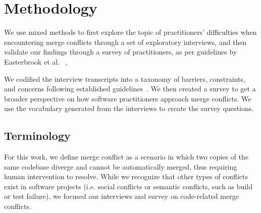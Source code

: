 \section{Methodology}\label{methodology}

We use mixed methods to first explore the topic of practitioners' difficulties when encountering merge conflicts through a set of exploratory interviews, and then validate our findings through a survey of practitioners, as per guidelines by Easterbrook et al. ~\cite{easterbrook2008selecting}, 

We codified the interview transcripts into a taxonomy of barriers, constraints, and concerns following established guidelines~\cite{latoza2006maintaining, shull2008guide, tao2012software}. We then created a survey to get a broader perspective on how software practitioners approach merge conflicts. We use the vocabulary generated from the interviews to create the survey questions.

\subsection{Terminology}\label{terminology_methods}
For this work, we define merge conflict as a scenario in which two copies of the same codebase diverge and cannot be automatically merged, thus requiring human intervention to resolve. 
While we recognize that other types of conflicts exist in software projects (i.e. social conflicts or semantic conflicts, such as build or test failure), we focused our interviews and survey on code-related merge conflicts.


